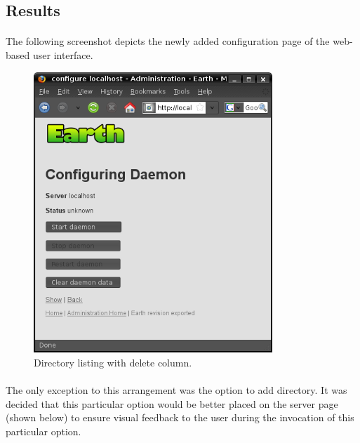 \documentclass[oneside, 10pt, a4]{article}
\begin{document}
\newpage


\subsection*{Results}

\paragraph{}
The following screenshot depicts the newly added configuration page of the web-based user interface.

\begin{figure}[h!]
\begin{center}
\includegraphics[width=90mm]{figs/screenshot}
\end{center}
\caption{Directory listing with delete column.}
\label{fig:screenshot}
\end{figure}

\paragraph{}
The only exception to this arrangement was the option to add directory. It was decided that this particular
option would be better placed on the server page (shown below) to ensure visual feedback to the user during
the invocation of this particular option.
\end{document}
